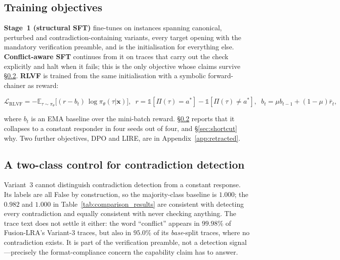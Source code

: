 \documentclass{article}
\begin{document}
\subsection{Training objectives}
\label{sec:pipeline}
\textbf{Stage~1 (structural SFT)} fine-tunes on instances spanning canonical,
perturbed and contradiction-containing variants, every target opening with the
mandatory verification preamble, and is the initialisation for everything else.
\textbf{Conflict-aware SFT} continues from it on traces that carry out the check
explicitly and halt when it fails; this is the only objective whose claims
survive \S\ref{sec:v3control}. \textbf{\textsc{RLVF}} is trained from the same
initialisation with a symbolic forward-chainer as reward:

\begin{equation}
\mathcal{L}_{\mathrm{RLVF}} = -\mathbb{E}_{\tau \sim \pi_\theta}\!\bigl[(r - b_t)\,\log\pi_\theta(\tau|\mathbf{x})\bigr],\;\; r=\mathbb{1}[\Pi(\tau){=}a^*]-\mathbb{1}[\Pi(\tau){\neq}a^*],\;\; b_t=\mu b_{t-1}+(1-\mu)\bar r_t,
\label{eq:rlvf}
\end{equation}

\noindent where $b_t$ is an EMA baseline over the mini-batch reward.
\S\ref{sec:v3control} reports that it collapses to a
constant responder in four seeds out of four, and \S\ref{sec:shortcut} why.
Two further objectives, DPO and LIRE, are in Appendix~\ref{app:retracted}.

\subsection{A two-class control for contradiction detection}
\label{sec:v3control}

Variant~3 cannot distinguish contradiction detection from a constant response.
Its labels are all False by construction, so the majority-class baseline is
$1.000$; the $0.982$ and $1.000$ in Table~\ref{tab:comparison_results} are
consistent with detecting every contradiction and equally consistent with never
checking anything. The trace text does not settle it either: the word
``conflict'' appears in $99.98\%$ of Fusion-LRA's Variant-3 traces, but also in
$95.0\%$ of its \emph{base}-split traces, where no contradiction exists. It is
part of the verification preamble, not a detection signal---precisely the
format-compliance concern the capability claim has to answer.
\end{document}
